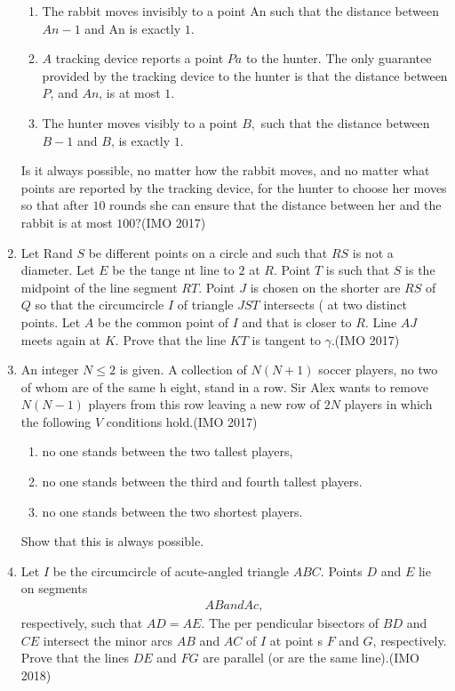 \begin{enumerate}
  \begin{enumerate}[label=(\roman*)]
  \item The rabbit moves invisibly to a point An such that the distance between $An-1$ and An is exactly $1$.
 \item $A$ tracking device reports a point $Pa$ to the hunter. The only guarantee provided by the tracking device to the hunter is that the distance between $    P$, and $An$, is at most $1$.
\item The hunter moves visibly to a point $B,$ such that the distance between $B-1$ and $B$, is exactly $1$.
 \end{enumerate}
 Is it always possible, no matter how the rabbit moves, and no matter what points are reported by the tracking device, for the hunter to choose her moves so that after $10$ rounds she can ensure that the distance between her and the rabbit is at most $100?$\hfill (IMO 2017)
\item Let Rand $S$ be different points on a circle and such that $RS$ is not a diameter. Let $E$ be the tange    nt line to $2$ at $R$. Point $T$ is such that $S$ is the midpoint of the line segment $RT$. Point $J$ is chosen on the shorter are $RS$ of $Q$ so that the circumcircle $I$ of triangle $JST$ intersects ( at two distinct points. Let $A$ be the common point of $I$ and that is closer to $R$. Line $AJ$ meets again at $K$. Prove that the line $KT$ is tangent to $\gamma$.\hfill (IMO 2017)
\item An integer $N\leq2$ is given. A collection of $N(N+1)$ soccer players, no two of whom are of the same h    eight, stand in a row. Sir Alex wants to remove $N(N-1)$ players from this row leaving a new row of $2N$ players in which the following $V$ conditions hold.\hfill (IMO 2017)                                         
	\begin{enumerate}[label=(\arabic *)]                
		\item no one stands between the two tallest players,        
\item no one stands between the third and fourth tallest players.                                       
\item no one stands between the two shortest players.                                                           
	\end{enumerate}                         
	Show that this is always possible.
\item Let $I$ be the circumcircle of acute-angled triangle $ABC$. Points $D$ and $E$     lie on segments \begin{align}AB and Ac,\end{align} respectively, such that $AD=AE$. The per    pendicular bisectors of $BD$ and $CE$ intersect the minor arcs $AB$ and $AC$ of $I$ at point    s $F$ and $G$, respectively. Prove that the lines $DE$ and $FG$ are parallel (or are the same line).\hfill (IMO 2018)

\end{enumerate}
